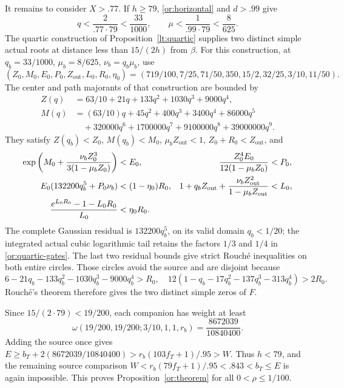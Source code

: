 \documentclass[11pt,reqno]{amsart}
\numberwithin{equation}{section}
\theoremstyle{definition}
\theoremstyle{remark}
\begin{document}
It remains to consider $X>.77$.  If $h\ge79$,
\eqref{or:horizontal} and $d>.99$ give
\begin{equation}\label{or:base-quartic-entry}
             q<\frac2{.77\cdot79}<\frac{33}{1000},
             \qquad \mu<\frac1{.99\cdot79}<\frac8{625}.
\end{equation}
The quartic construction of Proposition~\ref{lt:quartic} supplies two
distinct simple actual roots at distance less than $15/(2h)$ from
$\beta$.  For this construction, at $q_b=33/1000$, $\mu_b=8/625$,
$\nu_b=q_b\mu_b$,
use
\[
 (Z_0,M_0,E_0,P_0,Z_{\mathrm{out}},L_0,R_0,\eta_0)
   =(719/100,7/25,71/50,350,15/2,32/25,3/10,11/50).
\]
The center and path majorants of that construction are bounded by
\[
 \begin{split}
 Z(q)&=63/10+21q+133q^2+1030q^3+9000q^4,\\
 M(q)&=(63/10)q+45q^2+400q^3+3400q^4+86000q^5\\
     &\quad+320000q^6+1700000q^7+9100000q^8+39000000q^9.
 \end{split}
\]
They satisfy $Z(q_b)<Z_0$, $M(q_b)<M_0$,
$\mu_bZ_{\mathrm{out}}<1$, $Z_0+R_0<Z_{\mathrm{out}}$, and
\begin{align}
 \exp\left(M_0+\frac{\nu_bZ_0^3}{3(1-\mu_bZ_0)}\right)&<E_0,
 &\frac{Z_0^4E_0}{12(1-\mu_bZ_0)}&<P_0,\notag\\
 E_0(132200q_b^5+P_0\nu_b)&<(1-\eta_0)R_0,
 &1+q_bZ_{\mathrm{out}}+
 \frac{\nu_bZ_{\mathrm{out}}^2}{1-\mu_bZ_{\mathrm{out}}}&<L_0,
 \label{or:quartic-gates}\\
 \frac{e^{L_0R_0}-1-L_0R_0}{L_0}&<\eta_0R_0.&&\notag
\end{align}
The complete Gaussian residual is $132200q_b^5$, on its valid
domain $q_b<1/20$; the integrated actual cubic logarithmic tail
retains the factors $1/3$ and $1/4$ in
\eqref{or:quartic-gates}.  The last two residual bounds give strict
Rouch\'e inequalities on both entire circles.  Those circles avoid
the source and are disjoint because
\[
 6-21q_b-133q_b^2-1030q_b^3-9000q_b^4>R_0,
 \quad
 12(1-q_b-17q_b^2-137q_b^3-313q_b^4)>2R_0.
\]
Rouch\'e's theorem therefore gives the two distinct simple zeros of $F$.

Since $15/(2\cdot79)<19/200$, each companion has weight at least
\[
 \omega(19/200,19/200;3/10,1,1,r_b)
                         =\frac{8672039}{10840400}.
\]
Adding the source once gives
$E\ge b_T+2(8672039/10840400)>r_b(103f_T+1)/.95>W$.
Thus $h<79$, and the remaining source comparison
$W<r_b(79f_T+1)/.95<.843<b_T\le E$ is again impossible.
This proves Proposition~\ref{or:theorem} for all $0<\rho\le1/100$.
\end{document}
